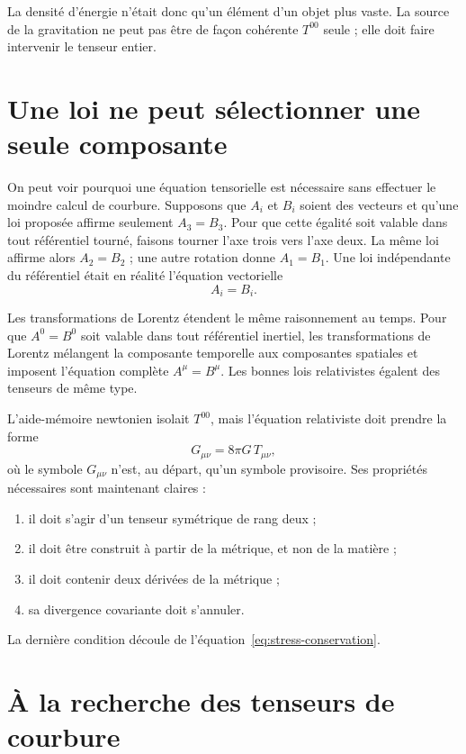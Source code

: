La densité d’énergie n’était donc qu’un élément d’un objet plus vaste. La source de la gravitation ne peut pas être de façon cohérente \(T^{00}\) seule ; elle doit faire intervenir le tenseur entier.

\section{Une loi ne peut sélectionner une seule composante}

On peut voir pourquoi une équation tensorielle est nécessaire sans effectuer le moindre calcul de courbure. Supposons que \(A_i\) et \(B_i\) soient des vecteurs et qu’une loi proposée affirme seulement \(A_3=B_3\). Pour que cette égalité soit valable dans tout référentiel tourné, faisons tourner l’axe trois vers l’axe deux. La même loi affirme alors \(A_2=B_2\) ; une autre rotation donne \(A_1=B_1\). Une loi indépendante du référentiel était en réalité l’équation vectorielle
\begin{equation}
 A_i=B_i.
\end{equation}

Les transformations de Lorentz étendent le même raisonnement au temps. Pour que \(A^0=B^0\) soit valable dans tout référentiel inertiel, les transformations de Lorentz mélangent la composante temporelle aux composantes spatiales et imposent l’équation complète \(A^\mu=B^\mu\). Les bonnes lois relativistes égalent des tenseurs de même type.

L’aide-mémoire newtonien isolait \(T^{00}\), mais l’équation relativiste doit prendre la forme
\begin{equation}
 G_{\mu\nu}=8\pi G\,T_{\mu\nu},
 \label{eq:field-schematic}
\end{equation}
où le symbole \(G_{\mu\nu}\) n’est, au départ, qu’un symbole provisoire. Ses propriétés nécessaires sont maintenant claires :
\begin{enumerate}
 \item il doit s’agir d’un tenseur symétrique de rang deux ;
 \item il doit être construit à partir de la métrique, et non de la matière ;
 \item il doit contenir deux dérivées de la métrique ;
 \item sa divergence covariante doit s’annuler.
\end{enumerate}
La dernière condition découle de l’équation~\eqref{eq:stress-conservation}.

\section{À la recherche des tenseurs de courbure}

